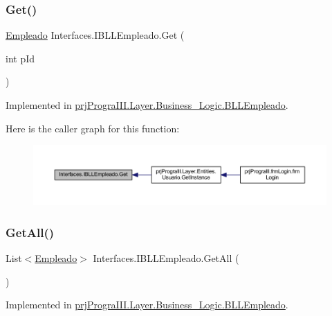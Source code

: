 \subsubsection{\texorpdfstring{Get()}{Get()}}
{\footnotesize\ttfamily \hyperlink{classprj_progra_i_i_i_1_1_layer_1_1_entities_1_1_empleado}{Empleado} Interfaces.\+I\+B\+L\+L\+Empleado.\+Get (\begin{DoxyParamCaption}\item[{int}]{p\+Id }\end{DoxyParamCaption})}



Implemented in \hyperlink{classprj_progra_i_i_i_1_1_layer_1_1_business___logic_1_1_b_l_l_empleado_abf66d9719a5e3c0f1914f0ae0d4ef671}{prj\+Progra\+I\+I\+I.\+Layer.\+Business\+\_\+\+Logic.\+B\+L\+L\+Empleado}.

Here is the caller graph for this function\+:
\nopagebreak
\begin{figure}[H]
\begin{center}
\leavevmode
\includegraphics[width=350pt]{interface_interfaces_1_1_i_b_l_l_empleado_a9eea24cebb452257b579be1c998f4a98_icgraph}
\end{center}
\end{figure}
\hypertarget{interface_interfaces_1_1_i_b_l_l_empleado_af28eb97c31bd09546d3ececa39800ae4}{}\label{interface_interfaces_1_1_i_b_l_l_empleado_af28eb97c31bd09546d3ececa39800ae4} 
\subsubsection{\texorpdfstring{Get\+All()}{GetAll()}}
{\footnotesize\ttfamily List$<$\hyperlink{classprj_progra_i_i_i_1_1_layer_1_1_entities_1_1_empleado}{Empleado}$>$ Interfaces.\+I\+B\+L\+L\+Empleado.\+Get\+All (\begin{DoxyParamCaption}{ }\end{DoxyParamCaption})}



Implemented in \hyperlink{classprj_progra_i_i_i_1_1_layer_1_1_business___logic_1_1_b_l_l_empleado_a78943295f86576befb00a28f59f64b07}{prj\+Progra\+I\+I\+I.\+Layer.\+Business\+\_\+\+Logic.\+B\+L\+L\+Empleado}.

